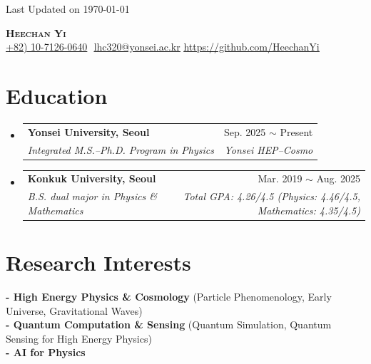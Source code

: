 \documentclass[letterpaper,11pt]{article}
\makeatletter
\newcommand{\resumeSubheading}[4]{
  \vspace{-2pt}\item
    \begin{tabular*}{0.97\textwidth}[t]{l@{\extracolsep{\fill}}r}
      \textbf{#1} & #2 \\
      \textit{\small#3} & \textit{\small #4} \\
    \end{tabular*}\vspace{-7pt}
}
\newcommand{\resumeSubHeadingListStart}{\begin{itemize}[leftmargin=0.15in, label={}]}
\newcommand{\resumeSubHeadingListEnd}{\end{itemize}}
\makeatother
\begin{document}
\begin{flushright}
  \color{gray}
  \item
  {Last Updated on \today}
\end{flushright}

\vspace{-5pt}

\begin{center}
    \textbf{\Huge \scshape Heechan Yi} \\ \vspace{8pt}
    \small
    \phone
    \underline{+82) 10-7126-0640} $  $
    \href{mailto:lhc320@yonsei.ac.kr}{\underline{lhc320@yonsei.ac.kr}}
    \href{https://github.com/HeechanYi}{\underline{https://github.com/HeechanYi}} $  $
    \\
\end{center}

\section{Education}
  \resumeSubHeadingListStart

    \resumeSubheading
      {Yonsei University, Seoul}{Sep. 2025 $\sim$ Present}
      {Integrated M.S.--Ph.D. Program in Physics}{Yonsei HEP--Cosmo}

    \vspace{6pt}

    \resumeSubheading
      {Konkuk University, Seoul}{Mar. 2019 $\sim$ Aug. 2025}
      {B.S. dual major in Physics \& Mathematics}{Total GPA: 4.26/4.5
      \small{(Physics: 4.46/4.5, Mathematics: 4.35/4.5)}}

    \vspace{8pt}

  \resumeSubHeadingListEnd

\section{Research Interests}
 \begin{itemize}[leftmargin=0.15in, label={}]
    \small{\item{
     \textbf{- High Energy Physics \& Cosmology}
     {\scriptsize{(Particle Phenomenology, Early Universe, Gravitational Waves)}} \\
     \textbf{- Quantum Computation \& Sensing}
     {\scriptsize{(Quantum Simulation, Quantum Sensing for High Energy Physics)}} \\
     \textbf{- AI for Physics}
    }}
 \end{itemize}
\end{document}
